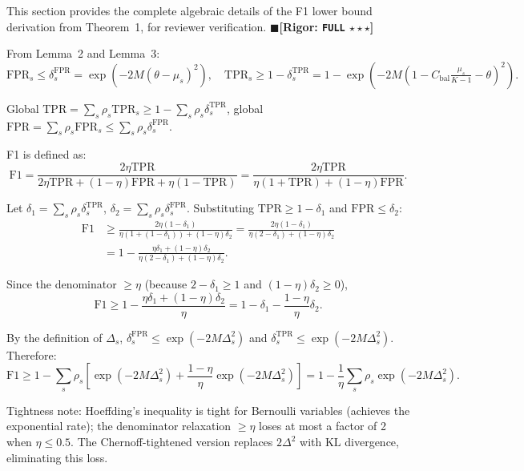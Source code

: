 \documentclass[12pt,a4paper]{article}
\theoremstyle{definition}
\theoremstyle{remark}
\newcommand{\rigorFull}{$\blacksquare$\;\textbf{[Rigor: \texttt{FULL} $\star\star\star$]}}
\begin{document}
This section provides the complete algebraic details of the F1 lower bound derivation from Theorem~1, for reviewer verification.
\rigorFull

From Lemma~2 and Lemma~3:
\begin{equation}
\mathrm{FPR}_s \leq \delta_s^{\text{FPR}} = \exp(-2M(\theta-\mu_s)^2), \quad
\mathrm{TPR}_s \geq 1 - \delta_s^{\text{TPR}} = 1 - \exp(-2M(1-C_{\text{bal}}\tfrac{\mu_s}{K-1}-\theta)^2).
\end{equation}

Global $\mathrm{TPR} = \sum_s \rho_s \mathrm{TPR}_s \geq 1 - \sum_s \rho_s \delta_s^{\text{TPR}}$,
global $\mathrm{FPR} = \sum_s \rho_s \mathrm{FPR}_s \leq \sum_s \rho_s \delta_s^{\text{FPR}}$.

F1 is defined as:
\begin{equation}
\mathrm{F1} = \frac{2\eta\mathrm{TPR}}{2\eta\mathrm{TPR} + (1-\eta)\mathrm{FPR} + \eta(1-\mathrm{TPR})}
          = \frac{2\eta\mathrm{TPR}}{\eta(1+\mathrm{TPR}) + (1-\eta)\mathrm{FPR}}.
\end{equation}

Let $\delta_1 = \sum_s \rho_s \delta_s^{\text{TPR}}$, $\delta_2 = \sum_s \rho_s \delta_s^{\text{FPR}}$. Substituting $\mathrm{TPR} \geq 1-\delta_1$ and $\mathrm{FPR} \leq \delta_2$:
\begin{align}
\mathrm{F1} &\geq \frac{2\eta(1-\delta_1)}{\eta(1+(1-\delta_1)) + (1-\eta)\delta_2}
            = \frac{2\eta(1-\delta_1)}{\eta(2-\delta_1) + (1-\eta)\delta_2} \\
            &= 1 - \frac{\eta\delta_1 + (1-\eta)\delta_2}{\eta(2-\delta_1) + (1-\eta)\delta_2}.
\end{align}

Since the denominator $\geq \eta$ (because $2-\delta_1 \geq 1$ and $(1-\eta)\delta_2 \geq 0$),
\begin{equation}
\mathrm{F1} \geq 1 - \frac{\eta\delta_1 + (1-\eta)\delta_2}{\eta} = 1 - \delta_1 - \frac{1-\eta}{\eta}\delta_2.
\end{equation}

By the definition of $\Delta_s$, $\delta_s^{\text{FPR}} \leq \exp(-2M\Delta_s^2)$ and $\delta_s^{\text{TPR}} \leq \exp(-2M\Delta_s^2)$. Therefore:
\begin{equation}
\mathrm{F1} \geq 1 - \sum_s \rho_s\left[\exp(-2M\Delta_s^2) + \frac{1-\eta}{\eta}\exp(-2M\Delta_s^2)\right]
          = 1 - \frac{1}{\eta}\sum_s \rho_s \exp(-2M\Delta_s^2).
\end{equation}

Tightness note: Hoeffding's inequality is tight for Bernoulli variables (achieves the exponential rate); the denominator relaxation $\geq \eta$ loses at most a factor of 2 when $\eta \leq 0.5$. The Chernoff-tightened version replaces $2\Delta^2$ with $\mathrm{KL}$ divergence, eliminating this loss.
\end{document}
